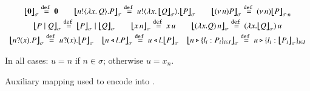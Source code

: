 \begin{figure}[t!]
\[%
	\begin{array}{c}
		\auxmapp{\inact}{{}}{\sigma}  \defeq  \inact
		\qquad \auxmapp{\bout{n}{\abs{x}{Q}} P}{{}}{\sigma} \defeq \bout{u}{\abs{x}{\auxmapp{Q}{{}}{\sigma}}} \auxmapp{P}{{}}{\sigma}
		\qquad
		\auxmapp{\news{n} P}{{}}{\sigma} \defeq \news{n} \auxmapp{P}{{}}{{\sigma \cat n}}
		\\[1mm]

		\auxmapp{P \Par Q}{{}}{\sigma} \defeq \auxmapp{P}{{}}{\sigma} \Par \auxmapp{Q}{{}}{\sigma} 
		\qquad
		\auxmapp{\appl{x}{n}}{{}}{\sigma} \defeq \appl{x}{u}
		\qquad
		\auxmapp{\appl{(\lambda x.Q)}{n}}{{}}{\sigma}  \defeq \appl{(\lambda x.\auxmapp{Q}{{}}{\sigma})}{u}
		\\[1mm]
		\auxmapp{\binp{n}{x} P}{{}}{\sigma} \defeq \binp{u}{x} \auxmapp{P}{{}}{\sigma} 
		\quad
		\auxmapp{\bsel{n}{l} P}{{}}{\sigma} \defeq \bsel{u}{l} \auxmapp{P}{{}}{\sigma} 
		\quad
		\auxmapp{\bbra{n}{l_i:P_i}_{i \in I}}{{}}{\sigma} \defeq \bbra{u}{l_i:\auxmapp{P_i}{{}}{\sigma}}_{i \in I}
	\end{array}
\]
\begin{center}
	{In all cases: $u = n$ if $n\in \sigma$; otherwise $u = x_n$.}
\end{center}
\vspace{-3mm}
\caption{\label{f:auxmap} Auxiliary mapping used to encode \HOp into \HO.}
\vspace{-1mm}
\end{figure}

